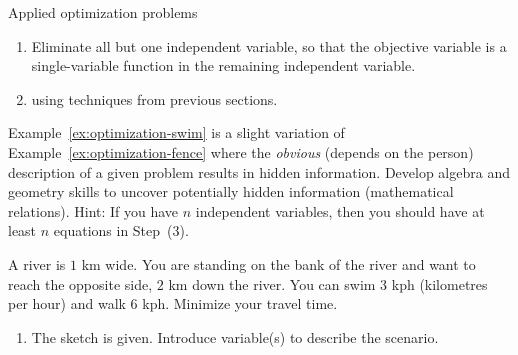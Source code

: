 \documentclass[../main.tex]{subfiles}
\begin{document}
\begin{lesson}{Applied optimization problems}
\begin{example}
\begin{enumerate}
      \item Eliminate all but one independent variable, so that the objective variable is a single-variable function in the remaining independent variable. 

      \item {} using techniques from previous sections.
    \end{enumerate}
  \end{example}
  \clearpage

  Example~\ref{ex:optimization-swim} is a slight variation of Example~\ref{ex:optimization-fence} where the \emph{obvious} (depends on the person) description of a given problem results in hidden information. Develop algebra and geometry skills to uncover potentially hidden information (mathematical relations). Hint: If you have \(n\) independent variables, then you should have at least \(n\) equations in Step~(3).

  \begin{example} \label{ex:optimization-swim}
    A  river is \(1\) km wide. You are standing on the bank of the river and want to reach the opposite side, \(2\) km down the river. You can swim \(3\) kph (kilometres per hour) and walk \(6\) kph. Minimize your travel time.

    \hfill{}

    \begin{enumerate}
      \item The sketch is given. Introduce variable(s) to describe the scenario.


\end{enumerate}
\end{example}
\end{lesson}
\end{document}
